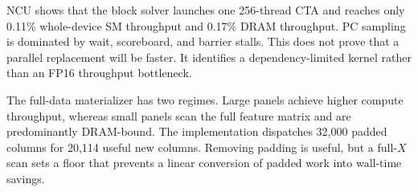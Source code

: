 NCU shows that the block solver launches one 256-thread CTA and reaches only
0.11\% whole-device SM throughput and 0.17\% DRAM throughput. PC sampling is
dominated by wait, scoreboard, and barrier stalls. This does not prove that a
parallel replacement will be faster. It identifies a dependency-limited
kernel rather than an FP16 throughput bottleneck.

The full-data materializer has two regimes. Large panels achieve higher
compute throughput, whereas small panels scan the full feature matrix and are
predominantly DRAM-bound. The implementation dispatches 32,000 padded columns
for 20,114 useful new columns. Removing padding is useful, but a full-$X$ scan
sets a floor that prevents a linear conversion of padded work into wall-time
savings.
